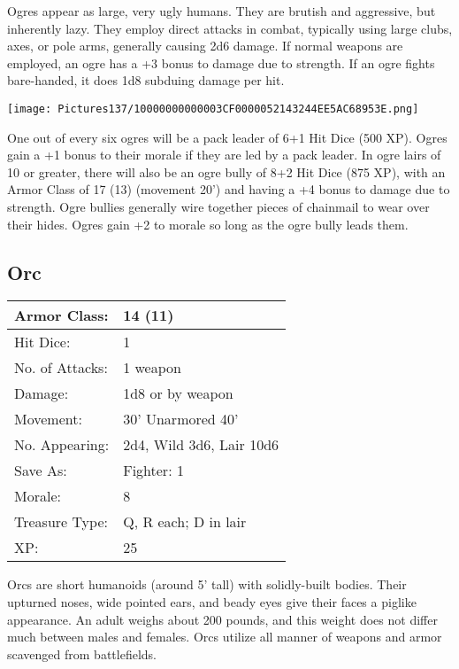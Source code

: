 \documentclass[a4paper,twoside,openany,10pt]{book}
\begin{document}
\begin{multicols}{2}
Ogres appear as large, very ugly humans. They are brutish and aggressive, but inherently lazy. They employ direct attacks in combat, typically using large clubs, axes, or pole arms, generally causing 2d6 damage. If normal weapons are employed, an ogre has a +3 bonus to damage due to strength. If an ogre fights bare-handed, it does 1d8 subduing damage per hit.

\begin{center} \texttt{[image: Pictures137/10000000000003CF0000052143244EE5AC68953E.png]} \end{center}

One out of every six ogres will be a pack leader of 6+1 Hit Dice (500 XP). Ogres gain a +1 bonus to their morale if they are led by a pack leader. In ogre lairs of 10 or greater, there will also be an ogre bully of 8+2 Hit Dice (875 XP), with an Armor Class of 17 (13) (movement 20') and having a +4 bonus to damage due to strength. Ogre bullies generally wire together pieces of chainmail to wear over their hides. Ogres gain +2 to morale so long as the ogre bully leads them.

\subsection*{Orc}\label{orc}

\begin{tabularx}{0.50\textwidth}{@{}lX@{}}
Armor Class: & 14 (11) \\\hline
Hit Dice: & 1 \\\hline
No. of Attacks: & 1 weapon \\\hline
Damage: & 1d8 or by weapon \\\hline
Movement: & 30' Unarmored 40' \\\hline
No. Appearing: & 2d4, Wild 3d6, Lair 10d6 \\\hline
Save As: & Fighter: 1 \\\hline
Morale: & 8 \\\hline
Treasure Type: & Q, R each; D in lair \\\hline
XP: & 25 \\\hline
\end{tabularx}\medskip

Orcs are short humanoids (around 5' tall) with solidly-built bodies. Their upturned noses, wide pointed ears, and beady eyes give their faces a piglike appearance. An adult weighs about 200 pounds, and this weight does not differ much between males and females. Orcs utilize all manner of weapons and armor scavenged from battlefields.



\end{multicols}
\end{document}
